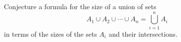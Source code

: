 \documentclass{book}
\begin{document}
\setcounter{cpjt}{220}
\addtocounter{cpjt}{-1}
\begin{activity}\label{nsetintersection}
\hypertarget{p-1177}{}%
Conjecture a formula for the size of a union of sets%
\begin{equation*}
A_1\cup
A_2\cup \cdots\cup A_n = \bigcup_{i=1}^n A_i
\end{equation*}
in terms of the sizes of the sets \(A_i\) and their intersections.%
\par\smallskip%
\noindent\end{activity}

\clearpage
\end{document}

